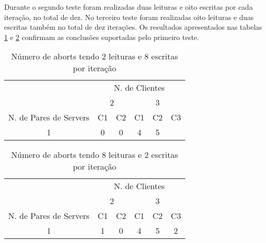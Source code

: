 Durante o segundo teste foram realizadas duas leituras e oito escritas por cada iteração, no total de dez. No terceiro teste foram realizadas oito leituras e duas escritas também no total de dez iterações. Os resultados apresentados nas tabelas \ref{figBAborts} e \ref{figCAborts} confirmam as conclusões suportadas pelo primeiro teste.

\begin{table}[h]
\begin{tabular}{c|c|c|c|c|c|}
\cline{2-6}
                                 & \multicolumn{5}{c|}{N. de Clientes}                   \\ \cline{2-6} 
                                 & \multicolumn{2}{c|}{2} & \multicolumn{3}{c|}{3} \\ \hline
\multicolumn{1}{|c|}{N. de Pares de Servers} & C1         & C2        & C1     & C2    & C3    \\ \hline
\multicolumn{1}{|c|}{1}          & 0          & 0         & 4      & 5     &       \\ \hline
\end{tabular}
\caption{Número de aborts tendo 2 leituras e 8 escritas por iteração} \label{figBAborts}
\end{table}

\begin{table}[h]
\begin{tabular}{c|c|c|c|c|c|}
\cline{2-6}
                                 & \multicolumn{5}{c|}{N. de Clientes}                   \\ \cline{2-6} 
                                 & \multicolumn{2}{c|}{2} & \multicolumn{3}{c|}{3} \\ \hline
\multicolumn{1}{|c|}{N. de Pares de Servers} & C1         & C2        & C1     & C2    & C3    \\ \hline
\multicolumn{1}{|c|}{1}          & 1          & 0         & 4      & 5     & 2     \\ \hline
\end{tabular}
\caption{Número de aborts tendo 8 leituras e 2 escritas por iteração} \label{figCAborts}
\end{table}